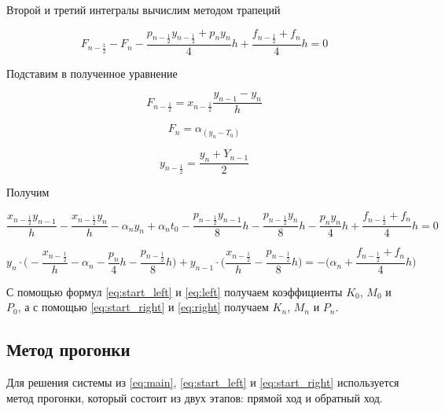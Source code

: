 Второй и третий интегралы вычислим методом трапеций

\begin{equation*}
    F_{n-\frac{1}{2}} - F_n -
    \frac{p_{n-\frac{1}{2}}y_{n-\frac{1}{2}} + p_ny_n}{4} h +
    \frac{f_{n-\frac{1}{2}} + f_n}{4} h = 0
\end{equation*}

Подставим в полученное уравнение

\begin{equation*}
    F_{n-\frac{1}{2}} = x_{n-\frac{1}{2}} \frac{y_{n-1} - y_n}{h}
\end{equation*}

\begin{equation*}
    F_n = \alpha_(y_n-T_0)
\end{equation*}

\begin{equation*}
    y_{n-\frac{1}{2}} = \frac{y_n + Y_{n-1}}{2}
\end{equation*}

Получим

\begin{equation*}
    \frac{x_{n-\frac{1}{2}} y_{n-1}}{h} -
    \frac{x_{n-\frac{1}{2}} y_{n}}{h} -
    \alpha_ny_n +
    \alpha_nt_0 -
    \frac{p_{n-\frac{1}{2}} y_{n-1}}{8}h -
    \frac{p_{n-\frac{1}{2}} y_{n}}{8}h -
    \frac{p_{n}y_{n}}{4}h +
    \frac{f_{n-\frac{1}{2}} + f_n}{4}h = 0
\end{equation*}

\begin{equation}\label{eq:right}
    y_n \cdot \bigg( -\frac{x_{n-\frac{1}{2}}}{h} - \alpha_n -
    \frac{p_n}{4}h - \frac{p_{n-\frac{1}{2}}}{8} h \bigg) +
    y_{n-1} \cdot \bigg( \frac{x_{n-\frac{1}{2}}}{h} -
    \frac{p_{n-\frac{1}{2}}}{8} h \bigg) = - \bigg(
    \alpha_n + \frac{f_{n-\frac{1}{2}} + f_n}{4} h \bigg)
\end{equation}

С помощью формул \ref{eq:start_left} и \ref{eq:left} получаем коэффициенты
$K_0$, $M_0$ и $P_0$, а с помощью \ref{eq:start_right} и \ref{eq:right} получаем
$K_n$, $M_n$ и $P_n$.

\subsection{Метод прогонки}

Для решения системы из \ref{eq:main}, \ref{eq:start_left} и \ref{eq:start_right}
используется метод прогонки, который состоит из двух этапов: прямой ход и
обратный ход.

